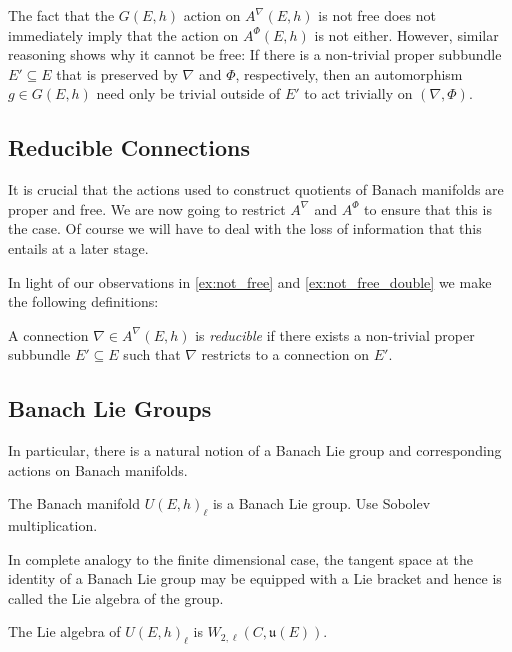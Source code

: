 \documentclass[12pt]{ociamthesis}  %
\begin{document}
\begin{example}\label{ex:not_free_double}
  The fact that the $G(E,h)$ action on $A^\nabla(E,h)$ is not free does not
  immediately imply that the action on $A^\Phi(E,h)$ is not either. However,
  similar reasoning shows why it cannot be free: If there is a non-trivial
  proper subbundle $E'\subseteq E$ that is preserved by $\nabla$ and $\Phi$,
  respectively, then an automorphism $g\in G(E,h)$ need only be trivial
  outside of $E'$ to act trivially on $(\nabla,\Phi)$.
\end{example}

\subsection{Reducible Connections}

It is crucial that the actions used to construct quotients of Banach manifolds
are proper and free. We are now going to restrict $A^\nabla$ and $A^\Phi$ to
ensure that this is the case. Of course we will have to deal with the loss of
information that this entails at a later stage.

In light of our observations in \ref{ex:not_free} and \ref{ex:not_free_double}
we make the following definitions:

\begin{definition}
  A connection $\nabla\in A^\nabla(E,h)$ is \emph{reducible} if there exists
  a non-trivial proper subbundle $E'\subseteq E$ such that $\nabla$ restricts
  to a connection on $E'$.
\end{definition}

\subsection{Banach Lie Groups}

In particular, there is a natural notion of a Banach Lie group and
corresponding actions on Banach manifolds.

\begin{example}
  The Banach manifold $U(E,h)_\ell$ is a Banach Lie group.
  Use Sobolev multiplication. \missingexample
\end{example}

In complete analogy to the finite dimensional case, the tangent space
at the identity of a Banach Lie group may be equipped with a Lie bracket
and hence is called the Lie algebra of the group.

\begin{example}
  The Lie algebra of $U(E,h)_\ell$ is $W_{2,\ell}(C,\mathfrak u(E))$.
\end{example}
\end{document}
